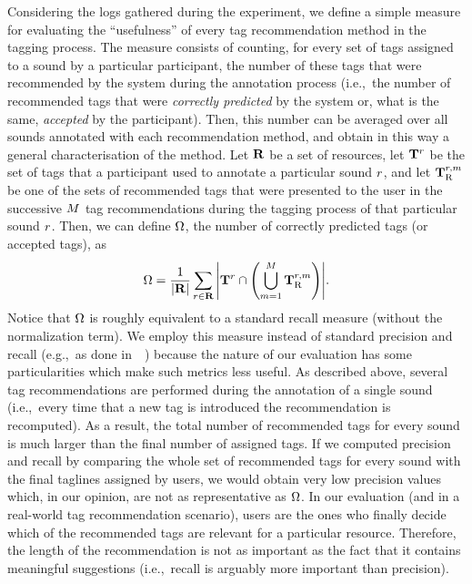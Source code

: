Considering the logs gathered during the experiment, we define a simple measure for evaluating the ``usefulness'' of every tag recommendation method in the tagging process. The measure consists of counting, for every set of tags assigned to a sound by a particular participant, the number of these tags that were recommended by the system during the annotation process (i.e.,~the number of recommended tags that were \emph{correctly predicted} by the system or, what is the same, \emph{accepted} by the participant). Then, this number can be averaged over all sounds annotated with each recommendation method, and obtain in this way a general characterisation of the method.
Let $\mathbf{R}$ be a set of resources, let $\mathbf{T}^r$ be the set of tags that a participant used to annotate a particular sound $r$, and let $\mathbf{T}_{\text{R}}^{r, m}$ be one of the sets of recommended tags that were presented to the user in the successive $M$ tag recommendations during the tagging process of that particular sound $r$. Then, we can define $\Omega$, the number of correctly predicted tags (or accepted tags), as
\begin{equation}
\Omega = \frac{1}{|\mathbf{R}|} \sum\limits_{r\in \mathbf{R}}{\left\vert \mathbf{T}^r \cap \left( \bigcup^{M}_{m=1} \mathbf{T}_{\text{R}}^{r, m} \right) \right\vert} .
\label{class:eq:n_accepted_tags}
\end{equation}
Notice that $\Omega$ is roughly equivalent to a standard recall measure (without the normalization term). We employ this measure instead of standard precision and recall (e.g.,~as done in~\citeauthor{Jaschke2009}~\citeyear{Jaschke2009}) because the nature of our evaluation has some particularities which make such metrics less useful. As described above, several tag recommendations are performed during the annotation of a single sound (i.e.,~every time that a new tag is introduced the recommendation is recomputed). As a result, the total number of recommended tags for every sound is much larger than the final number of assigned tags. If we computed precision and recall by comparing the whole set of recommended tags for every sound with the final taglines assigned by users, we would obtain very low precision values which, in our opinion, are not as representative as $\Omega$. In our evaluation (and in a real-world tag recommendation scenario), users are the ones who finally decide which of the recommended tags are relevant for a particular resource. Therefore, the length of the recommendation is not as important as the fact that it contains meaningful suggestions (i.e.,~recall is arguably more important than precision).



